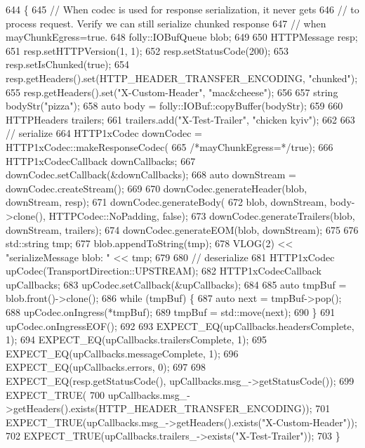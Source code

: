 \begin{DoxyCode}
644                                                       \{
645   \textcolor{comment}{// When codec is used for response serialization, it never gets}
646   \textcolor{comment}{// to process request. Verify we can still serialize chunked response}
647   \textcolor{comment}{// when mayChunkEgress=true.}
648   folly::IOBufQueue blob;
649 
650   HTTPMessage resp;
651   resp.setHTTPVersion(1, 1);
652   resp.setStatusCode(200);
653   resp.setIsChunked(\textcolor{keyword}{true});
654   resp.getHeaders().set(HTTP\_HEADER\_TRANSFER\_ENCODING, \textcolor{stringliteral}{"chunked"});
655   resp.getHeaders().set(\textcolor{stringliteral}{"X-Custom-Header"}, \textcolor{stringliteral}{"mac&cheese"});
656 
657   \textcolor{keywordtype}{string} bodyStr(\textcolor{stringliteral}{"pizza"});
658   \textcolor{keyword}{auto} body = folly::IOBuf::copyBuffer(bodyStr);
659 
660   HTTPHeaders trailers;
661   trailers.add(\textcolor{stringliteral}{"X-Test-Trailer"}, \textcolor{stringliteral}{"chicken kyiv"});
662 
663   \textcolor{comment}{// serialize}
664   HTTP1xCodec downCodec = HTTP1xCodec::makeResponseCodec(
665       \textcolor{comment}{/*mayChunkEgress=*/}\textcolor{keyword}{true});
666   HTTP1xCodecCallback downCallbacks;
667   downCodec.setCallback(&downCallbacks);
668   \textcolor{keyword}{auto} downStream = downCodec.createStream();
669 
670   downCodec.generateHeader(blob, downStream, resp);
671   downCodec.generateBody(
672       blob, downStream, body->clone(), HTTPCodec::NoPadding, \textcolor{keyword}{false});
673   downCodec.generateTrailers(blob, downStream, trailers);
674   downCodec.generateEOM(blob, downStream);
675 
676   std::string tmp;
677   blob.appendToString(tmp);
678   VLOG(2) << \textcolor{stringliteral}{"serializeMessage blob: "} << tmp;
679 
680   \textcolor{comment}{// deserialize}
681   HTTP1xCodec upCodec(TransportDirection::UPSTREAM);
682   HTTP1xCodecCallback upCallbacks;
683   upCodec.setCallback(&upCallbacks);
684 
685   \textcolor{keyword}{auto} tmpBuf = blob.front()->clone();
686   \textcolor{keywordflow}{while} (tmpBuf) \{
687     \textcolor{keyword}{auto} next = tmpBuf->pop();
688     upCodec.onIngress(*tmpBuf);
689     tmpBuf = std::move(next);
690   \}
691   upCodec.onIngressEOF();
692 
693   EXPECT\_EQ(upCallbacks.headersComplete, 1);
694   EXPECT\_EQ(upCallbacks.trailersComplete, 1);
695   EXPECT\_EQ(upCallbacks.messageComplete, 1);
696   EXPECT\_EQ(upCallbacks.errors, 0);
697 
698   EXPECT\_EQ(resp.getStatusCode(), upCallbacks.msg_->getStatusCode());
699   EXPECT\_TRUE(
700       upCallbacks.msg_->getHeaders().exists(HTTP\_HEADER\_TRANSFER\_ENCODING));
701   EXPECT\_TRUE(upCallbacks.msg_->getHeaders().exists(\textcolor{stringliteral}{"X-Custom-Header"}));
702   EXPECT\_TRUE(upCallbacks.trailers_->exists(\textcolor{stringliteral}{"X-Test-Trailer"}));
703 \}
\end{DoxyCode}
